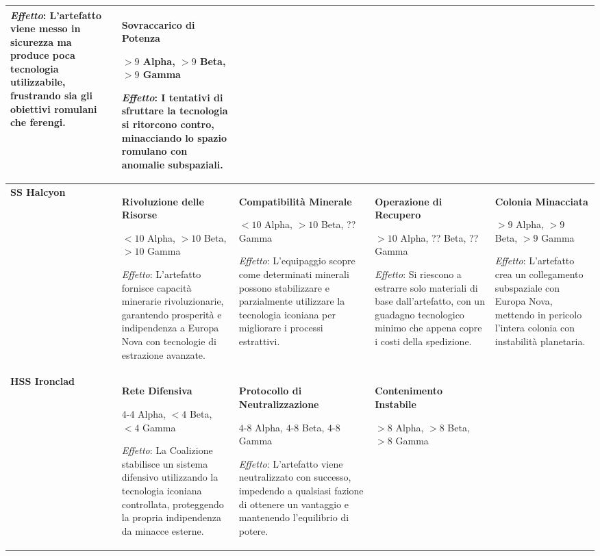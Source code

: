 \documentclass[letterpaper,twocolumn,openany,nodeprecatedcode]{dndbook}
\begin{document}
\begin{landscape}
\begin{table}[htbp]
\begin{tabular}{|p{2.3cm}|p{4cm}|p{4cm}|p{4cm}|p{4cm}|}
\textit{Effetto}: L'artefatto viene messo in sicurezza ma produce poca tecnologia utilizzabile, frustrando sia gli obiettivi romulani che ferengi.
& 
\textbf{Sovraccarico di Potenza}

$>9$ Alpha, $>9$ Beta, $>9$ Gamma

\textit{Effetto}: I tentativi di sfruttare la tecnologia si ritorcono contro, minacciando lo spazio romulano con anomalie subspaziali.
\\ 
\hline
\textbf{SS Halcyon} & 
\textbf{Rivoluzione delle Risorse}

$<10$ Alpha, $>10$ Beta, $>10$ Gamma

\textit{Effetto}: L'artefatto fornisce capacità minerarie rivoluzionarie, garantendo prosperità e indipendenza a Europa Nova con tecnologie di estrazione avanzate.
& 
\textbf{Compatibilità Minerale}

$<10$ Alpha, $>10$ Beta, ?? Gamma

\textit{Effetto}: L'equipaggio scopre come determinati minerali possono stabilizzare e parzialmente utilizzare la tecnologia iconiana per migliorare i processi estrattivi.
& 
\textbf{Operazione di Recupero}

$>10$ Alpha, ?? Beta, ?? Gamma

\textit{Effetto}: Si riescono a estrarre solo materiali di base dall'artefatto, con un guadagno tecnologico minimo che appena copre i costi della spedizione.
& 
\textbf{Colonia Minacciata}

$>9$ Alpha, $>9$ Beta, $>9$ Gamma

\textit{Effetto}: L'artefatto crea un collegamento subspaziale con Europa Nova, mettendo in pericolo l'intera colonia con instabilità planetaria.
\\ 
\hline
\textbf{HSS Ironclad} & 
\textbf{Rete Difensiva}

$4$-$4$ Alpha, $<4$ Beta, $<4$ Gamma

\textit{Effetto}: La Coalizione stabilisce un sistema difensivo utilizzando la tecnologia iconiana controllata, proteggendo la propria indipendenza da minacce esterne.
& 
\textbf{Protocollo di Neutralizzazione}

$4$-$8$ Alpha, $4$-$8$ Beta, $4$-$8$ Gamma

\textit{Effetto}: L'artefatto viene neutralizzato con successo, impedendo a qualsiasi fazione di ottenere un vantaggio e mantenendo l'equilibrio di potere.
& 
\textbf{Contenimento Instabile}

$>8$ Alpha, $>8$ Beta, $>8$ Gamma


\end{tabular}
\end{table}
\end{landscape}
\end{document}
